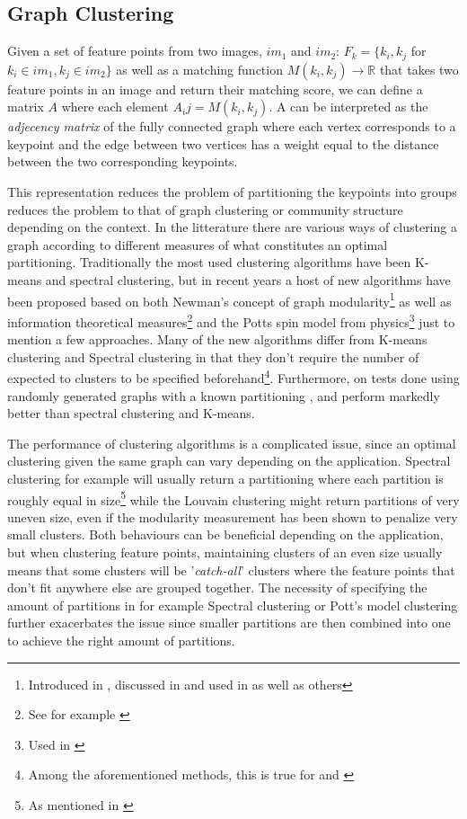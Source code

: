 \documentclass{article}
\begin{document}
\subsection{Graph Clustering}

Given a set of feature points from two images, $im_1$ and $im_2$: $F_k = 
\{k_i, k_j$ for $k_i \in im_1, k_j \in im_2\}$ as well as a matching 
function $M(k_i, k_j) \rightarrow \mathbb{R}$ that takes two feature 
points in an image and return their matching score, we can define a 
matrix $A$ where each element $A_ij = M(k_i, k_j)$. A can be interpreted 
as the \emph{adjecency matrix} of the fully connected graph where each 
vertex corresponds to a keypoint and the edge between two vertices has a 
weight equal to the distance between the two corresponding keypoints.

This representation reduces the problem of partitioning the keypoints 
into groups reduces the problem to that of graph clustering or community 
structure depending on the context. In the litterature there are various 
ways of clustering a graph according to different measures of what 
constitutes an optimal partitioning. Traditionally the most used 
clustering algorithms have been K-means and spectral clustering, but in 
recent years a host of new algorithms have been proposed based on both 
Newman's concept of graph modularity\footnote{Introduced in 
\cite{girvan2002}, discussed in \cite{brandes2007} and used in 
\cite{blondel2008} as well as others} as well as information theoretical 
measures\footnote{See for example \cite{rosvall2008}} and the Potts spin 
model from physics\footnote{Used in \cite{ronhovde2009}} just to mention 
a few approaches. Many of the new algorithms differ from K-means 
clustering and Spectral clustering in that they don't require the number 
of expected to clusters to be specified beforehand\footnote{Among the 
aforementioned methods, this is true for \cite{blondel2008} and 
\cite{rosvall2008}}.  Furthermore, on tests done using randomly 
generated graphs with a known partitioning \cite{blondel2008}, 
\cite{rosvall2008} and \cite{ronhovde2009} perform markedly better than 
spectral clustering and K-means\cite{lancichinetti2009}.

The performance of clustering algorithms is a complicated issue, since 
an optimal clustering given the same graph can vary depending on the 
application. Spectral clustering for example will usually return a 
partitioning where each partition is roughly equal in size\footnote{As 
mentioned in \cite{von2007}} while the Louvain 
clustering\cite{blondel2008} might return partitions of very uneven 
size, even if the modularity measurement has been shown to penalize very 
small clusters\cite{brandes2007}. Both behaviours can be beneficial 
depending on the application, but when clustering feature points, 
maintaining clusters of an even size usually means that some clusters 
will be '\emph{catch-all}' clusters where the feature points that don't 
fit anywhere else are grouped together. The necessity of specifying the 
amount of partitions in for example Spectral clustering or Pott's model 
clustering further exacerbates the issue since smaller partitions are 
then combined into one to achieve the right amount of partitions.
\end{document}
